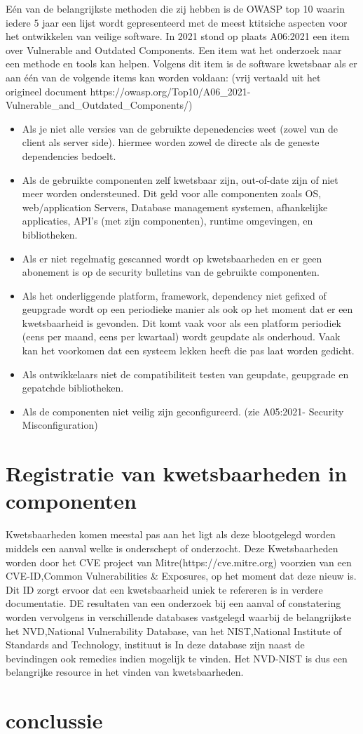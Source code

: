 Eén van de belangrijkste methoden die zij hebben is de OWASP top 10 waarin iedere 5 jaar een lijst wordt gepresenteerd met de meest ktitsiche aspecten voor het ontwikkelen van veilige software. In 2021 stond op plaats A06:2021 een item over Vulnerable and Outdated Components. Een item wat het onderzoek naar een methode en tools kan helpen. Volgens dit item is de software kwetsbaar als er aan één van de volgende items kan worden voldaan: (vrij vertaald uit het origineel document https://owasp.org/Top10/A06\_2021-Vulnerable\_and\_Outdated\_Components/)
\begin{itemize}
    \item Als je niet alle versies van de gebruikte depenedencies weet (zowel van de client als server side). hiermee worden zowel de directe als de geneste dependencies bedoelt.
    \item Als de gebruikte componenten zelf kwetsbaar zijn, out-of-date zijn of niet meer worden ondersteuned. Dit geld voor alle componenten zoals OS, web/application Servers, Database management systemen, afhankelijke applicaties, API's (met zijn componenten), runtime omgevingen, en bibliotheken.
    \item Als er niet regelmatig gescanned wordt op kwetsbaarheden en er geen abonement is op de security bulletins van de gebruikte componenten.
    \item Als het onderliggende platform, framework, dependency niet gefixed of geupgrade wordt op een periodieke manier als ook op het moment dat er een kwetsbaarheid is gevonden. Dit komt vaak voor als een platform periodiek (eens per maand, eens per kwartaal) wordt geupdate als onderhoud. Vaak kan het voorkomen dat een systeem lekken heeft die pas laat worden gedicht.
    \item Als ontwikkelaars niet de compatibiliteit testen van geupdate, geupgrade en gepatchde bibliotheken.
    \item Als de componenten niet veilig zijn geconfigureerd. (zie A05:2021- Security Misconfiguration)
\end{itemize}

\section{Registratie van kwetsbaarheden in componenten}\label{sec:registratie-van-kwetsbaarheden-in-bibliotheken}
Kwetsbaarheden komen meestal pas aan het ligt als deze blootgelegd worden middels een aanval welke is onderschept of onderzocht. Deze Kwetsbaarheden worden door het CVE project van Mitre(https://cve.mitre.org) voorzien van een CVE-ID,Common Vulnerabilities & Exposures, op het moment dat deze nieuw is. Dit ID zorgt ervoor dat een kwetsbaarheid uniek te refereren is in verdere documentatie. DE resultaten van een onderzoek bij een aanval of constatering worden vervolgens in verschillende databases vastgelegd waarbij de belangrijkste het NVD,National Vulnerability Database,  van het NIST,National Institute of Standards and Technology, instituut is
In deze database zijn naast de bevindingen ook remedies indien mogelijk te vinden. Het NVD-NIST is dus een belangrijke resource in het vinden van kwetsbaarheden.



\section{conclussie}
